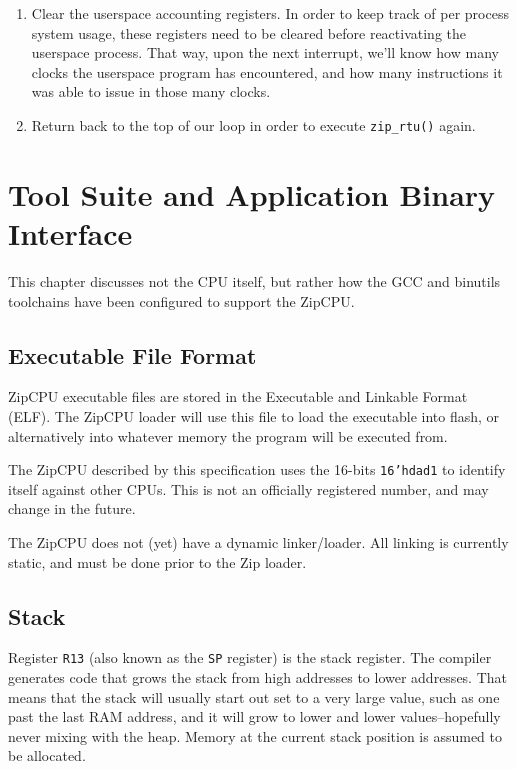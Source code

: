\documentclass{gqtekspec}
\begin{document}
\begin{enumerate}
\item Clear the userspace accounting registers.  In order to keep track of
	per process system usage, these registers need to be cleared before
	reactivating the userspace process.  That way, upon the next
	interrupt, we'll know how many clocks the userspace program has
	encountered, and how many instructions it was able to issue in
	those many clocks. 

\item Return back to the top of our loop in order to execute {\tt zip\_rtu()}
	again.
\end{enumerate}

\chapter{Tool Suite and Application Binary Interface}\label{chap:abi}
This chapter discusses not the CPU itself, but rather how the GCC and binutils
toolchains have been configured to support the ZipCPU.


\section{Executable File Format}\label{sec:abi-elf}
ZipCPU executable files are stored in the Executable and Linkable Format
(ELF).  The ZipCPU loader will use this file to load the executable into
flash, or alternatively into whatever memory the program will be executed from.

The ZipCPU described by this specification uses the 16-bits {\tt 16'hdad1}
to identify itself against other CPUs.  This is not an officially registered
number, and may change in the future.

The ZipCPU does not (yet) have a dynamic linker/loader.  All linking is
currently static, and must be done prior to the Zip loader.

\section{Stack}\label{sec:abi-stack}
Register {\tt R13} (also known as the {\tt SP} register) is the stack register.
The compiler generates code that grows the stack from
high addresses to lower addresses.  That means that the stack will usually
start out set to a very large value, such as one past the last RAM address,
and it will grow to lower and lower values--hopefully never mixing with the
heap.  Memory at the current stack position is assumed to be allocated.
\end{document}
